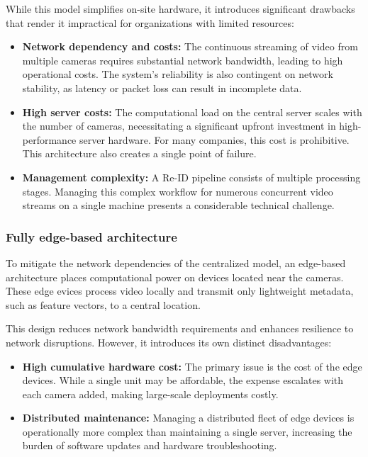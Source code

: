 \documentclass[../main.tex]{subfiles}
\begin{document}
While this model simplifies on-site hardware, it introduces significant drawbacks that render it impractical for organizations with limited resources:
\begin{itemize}
    \item \textbf{Network dependency and costs:} The continuous streaming of video from multiple cameras requires substantial network bandwidth, leading to high operational costs. The system's reliability is also contingent on network stability, as latency or packet loss can result in incomplete data.
    \item \textbf{High server costs:} The computational load on the central server scales with the number of cameras, necessitating a significant upfront investment in high-performance server hardware. For many companies, this cost is prohibitive. This architecture also creates a single point of failure.
    \item \textbf{Management complexity:} A Re-ID pipeline consists of multiple processing stages. Managing this complex workflow for numerous concurrent video streams on a single machine presents a considerable technical challenge.
\end{itemize}

\subsubsection{Fully edge-based architecture}
To mitigate the network dependencies of the centralized model, an edge-based architecture places computational power on devices located near the cameras. These edge evices process video locally and transmit only lightweight metadata, such as feature vectors, to a central location.

This design reduces network bandwidth requirements and enhances resilience to network disruptions. However, it introduces its own distinct disadvantages:
\begin{itemize}
    \item \textbf{High cumulative hardware cost:} The primary issue is the cost of the edge devices. While a single unit may be affordable, the expense escalates with each camera added, making large-scale deployments costly.
    \item \textbf{Distributed maintenance:} Managing a distributed fleet of edge devices is operationally more complex than maintaining a single server, increasing the burden of software updates and hardware troubleshooting.
\end{itemize}
\end{document}
